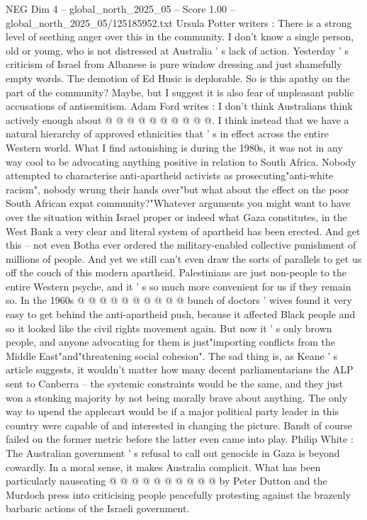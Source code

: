 \begin{textsample}{NEG Dim 4 – global\_north\_2025\_05 – Score 1.00 – global\_north\_2025\_05/125185952.txt}
Ursula Potter writers : There is a strong level of seething anger over this in the community.
I don't know a single person, old or young, who is not distressed at Australia ' s lack of action.
Yesterday ' s criticism of Israel from Albanese is pure window dressing and just shamefully empty words.
The demotion of Ed Husic is deplorable.
So is this apathy on the part of the community?
Maybe, but I suggest it is also fear of unpleasant public accusations of antisemitism.
Adam Ford writes : I don't think Australians think actively enough about @ @ @ @ @ @ @ @ @ @.
I think instead that we have a natural hierarchy of approved ethnicities that ' s in effect across the entire Western world.
What I find astonishing is during the 1980s, it was not in any way cool to be advocating anything positive in relation to South Africa.
Nobody attempted to characterise anti-apartheid activists as prosecuting"anti-white racism", nobody wrung their hands over"but what about the effect on the poor South African expat community?"Whatever arguments you might want to have over the situation within Israel proper or indeed what Gaza constitutes, in the West Bank a very clear and literal system of apartheid has been erected.
And get this -- not even Botha ever ordered the military-enabled collective punishment of millions of people.
And yet we still can't even draw the sorts of parallels to get us off the couch of this modern apartheid.
Palestinians are just non-people to the entire Western psyche, and it ' s so much more convenient for us if they remain so.
In the 1960s @ @ @ @ @ @ @ @ @ @ bunch of doctors ' wives found it very easy to get behind the anti-apartheid push, because it affected Black people and so it looked like the civil rights movement again.
But now it ' s only brown people, and anyone advocating for them is just"importing conflicts from the Middle East"and"threatening social cohesion".
The sad thing is, as Keane ' s article suggests, it wouldn't matter how many decent parliamentarians the ALP sent to Canberra -- the systemic constraints would be the same, and they just won a stonking majority by not being morally brave about anything.
The only way to upend the applecart would be if a major political party leader in this country were capable of and interested in changing the picture.
Bandt of course failed on the former metric before the latter even came into play.
Philip White : The Australian government ' s refusal to call out genocide in Gaza is beyond cowardly.
In a moral sense, it makes Australia complicit.
What has been particularly nauseating @ @ @ @ @ @ @ @ @ @ by Peter Dutton and the Murdoch press into criticising people peacefully protesting against the brazenly barbaric actions of the Israeli government.

\end{textsample}
